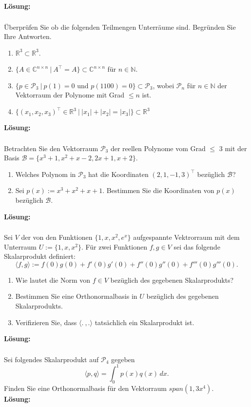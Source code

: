 \noindent \textbf{Lösung:}
\vspace{7cm}

\subsubsection{} %
Überprüfen Sie ob die folgenden Teilmengen Unterräume sind. Begründen Sie Ihre Antworten.
\begin{enumerate}[label=\alph*)]
    \item $\mathbb{R}^3 \subset \mathbb{R}^3$.
    \item $\{A\in \mathbb{C}^{n \times n}\: |\: A^\top = A \} \subset \mathbb{C}^{n \times n}$ für $n \in \mathbb{N}$.
    \item $\{p \in \mathcal{P}_3\: |\: p(1) = 0$ und $p(1100)=0\} \subset \mathcal{P}_3$, wobei $\mathcal{P}_n$ für $n \in \mathbb{N}$ der Vektorraum der Polynome mit Grad $\leq n$ ist.
    \item $\{(x_1, x_2, x_3)^\top \in \mathbb{R}^3 \: |\: \lvert x_1\rvert+\lvert x_2\rvert=\lvert x_3\rvert \}\subset \mathbb{R}^3$
\end{enumerate}

\noindent \textbf{Lösung:}

\newpage
\subsubsection{} %
Betrachten Sie den Vektorraum $\mathcal{P}_3$ der reellen Polynome vom Grad $\leq$ 3 mit der Basis $\mathcal{B} = \{x^3+1,x^2+x-2,2x+1,x+2\}$.
\begin{enumerate}[label=\alph*)]
    \item Welches Polynom in $\mathcal{P}_3$ hat die Koordinaten $(2,1,-1,3)^\top$ bezüglich $\mathcal{B}$?
    \item Sei $p(x):=x^3+x^2+x+1$. Bestimmen Sie die Koordinaten von $p(x)$ bezüglich $\mathcal{B}$.
\end{enumerate}
\noindent \textbf{Lösung:}

\newpage
\subsubsection{} %
Sei $V$ der von den Funktionen $\{1,x,x^2,e^x\}$ aufgespannte Vektrorraum mit dem Unterraum $U:=\{1,x,x^2\}$. Für zwei Funktionen $f,g \in V$ sei das folgende Skalarprodukt definiert:
\[
\langle f,g \rangle := f(0)g(0)+f'(0)g'(0)+f''(0)g''(0)+f'''(0)g'''(0).
\]\begin{enumerate}[label=\alph*)]
    \item Wie lautet die Norm von $f \in V$ bezüglich des gegebenen Skalarprodukts?
    \item Bestimmen Sie eine Orthonormalbasis in $U$ bezüglich des gegebenen Skalarprodukts.
    \item Verifizieren Sie, dass $\langle . \:,. \rangle$ tatsächlich ein Skalarprodukt ist.
\end{enumerate}

\noindent \textbf{Lösung:}

\newpage
\subsubsection{} %
Sei folgendes Skalarprodukt auf $\mathcal{P}_4$ gegeben
\[
\langle p,q \rangle = \int_{0}^{1} p(x)q(x) \,dx.
\]
Finden Sie eine Orthonormalbasis für den Vektorraum $span(1,3x^4)$. \\

\noindent \textbf{Lösung:}
